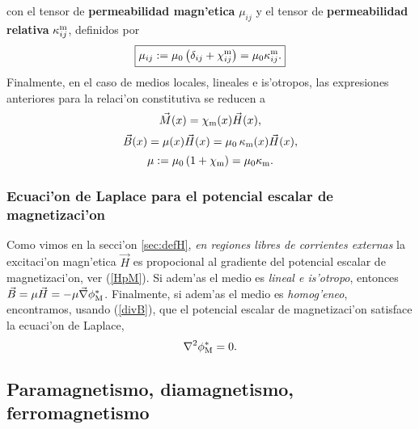 con el tensor de \textbf{permeabilidad magn'etica} $\mu_{ij}$ y el
tensor de \textbf{permeabilidad relativa} $\kappa^{\rm m}_{ij}$, definidos por
\begin{equation}
 \boxed{\mu_{ij}:=\mu_0\left(\delta_{ij}+\chi^{\rm
m}_{ij}\right)=\mu_0\kappa^{\rm m}_{ij}.}
\end{equation}
Finalmente, en el caso de medios locales, lineales e is'otropos, las
expresiones anteriores para la relaci'on constitutiva se reducen a
\begin{equation}
 \vec{M}(x)=\chi_{\rm m}(x)\vec{H}(x),
\end{equation}
\begin{equation}
 \vec{B}(x)=\mu(x)\vec{H}(x)=\mu_0\,\kappa_{\rm m}(x)\vec{H}(x),
\end{equation}
\begin{equation}
 \mu:=\mu_0\left(1+\chi_{\rm m}\right)=\mu_0\kappa_{\rm m}.
\end{equation}


\subsubsection{Ecuaci'on de Laplace para el potencial escalar de magnetizaci'on}
Como vimos en la secci'on \ref{sec:defH}, \textit{en regiones libres de corrientes externas} la excitaci'on magn'etica $\vec{H}$ es propocional al gradiente del potencial escalar de magnetizaci'on, ver (\ref{HpM}). Si adem'as el medio es \textit{lineal e is'otropo}, entonces $\vec{B}=\mu\vec{H}=-\mu\vec{\nabla}\phi^\ast_{\rm M}$. Finalmente, si adem'as el medio es \textit{homog'eneo}, encontramos, usando (\ref{divB}), que el potencial escalar de magnetizaci'on satisface la ecuaci'on de Laplace,
\begin{equation}
\nabla^2\phi^\ast_{\rm M}=0.
\end{equation}


\subsection{Paramagnetismo, diamagnetismo, ferromagnetismo}

